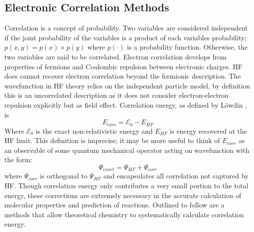   \subsection{Electronic Correlation Methods}
    Correlation is a concept of probability. Two variables are considered independent if the joint probability of the variables is a product of each variables probability; $p(x,y) = p(x) \times p(y)$ where $p(\cdot)$ is a probability function.  Otherwise, the two variables are said to be correlated.\cite{Kutzelnigg 2003}  Electron correlation develops from %
    properties of fermions and Coulombic repulsion between electronic charges. HF does cannot recover electron correlation beyond the fermionic description.  The wavefunction in HF theory relies on the independent particle model, by definition this is an uncorrelated description as it does not consider electron-electron repulsion explicitly but as %
    field effect. Correlation energy, as defined by L{\"o}wdin \cite{Lowdin 1959}, is 
      \begin{equation} \label{corr_E}
      E_{corr} = \mathcal{E}_{0} - E_{HF}
      \end{equation}
    Where $\mathcal{E}_0$ is the exact non-relativistic energy and $E_{HF}$ is energy recovered at the HF limit.  This definition is imprecise; it may be more useful to think of $E_{corr}$ as an observable of some quantum mechanical operator acting on wavefunction with the form:
      \begin{equation}
      \Psi_{exact} = \Psi_{HF} + \Psi_{corr}
      \end{equation}
    where $\Psi_{corr}$ is orthogonal to $\Psi_{HF}$ and encapsulates all correlation not captured by HF.\cite{Kong 2012}  Though correlation energy only contributes a very small portion to the total energy, these corrections are extremely necessary in the accurate calculation of molecular properties and prediction of reactions.  Outlined to follow are a methods that allow theoretical chemistry to systematically calculate correlation energy.

